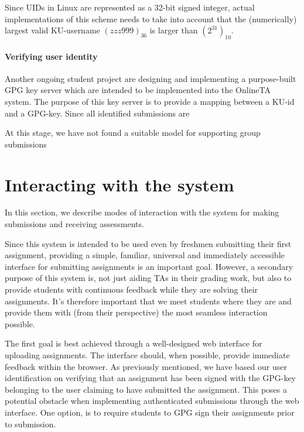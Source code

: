 Since UIDs in Linux are represented as a 32-bit signed integer, actual
implementations of this scheme needs to take into account that the
(numerically) largest valid KU-username $(zzz999)_{36}$ is larger than
$(2^{31})_{10}$.

\paragraph{Verifying user identity}
Another ongoing student project are designing and implementing a
purpose-built GPG key server which are intended to be implemented into
the OnlineTA system. The purpose of this key server is to provide a
mapping between a KU-id and a GPG-key. Since all identified
submissions are 

At this stage, we have not found a suitable model for supporting group
submissions


\section{Interacting with the system}
In this section, we describe modes of interaction with the system for
making submissions and receiving assessments.

Since this system is intended to be used even by freshmen submitting
their first assignment, providing a simple, familiar, universal and
immediately accessible interface for submitting assignments is an
important goal. However, a secondary purpose of this system is, not
just aiding TAs in their grading work, but also to provide students
with continuous feedback while they are solving their
assignments. It's therefore important that we meet students where they
are and provide them with (from their perspective) the most seamless
interaction possible.

The first goal is best achieved through a well-designed web interface
for uploading assignments. The interface should, when
possible, provide immediate feedback within the browser. As previously
mentioned, we have based our user identification on verifying that an
assignment has been signed with the GPG-key belonging to the user
claiming to have submitted the assignment. This poses a potential
obstacle when implementing authenticated submissions through the web
interface. One option, is to require students to GPG sign their
assignments prior to submission.


